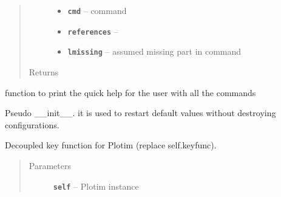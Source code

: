 \documentclass[letterpaper,10pt,english]{sphinxmanual}
\begin{document}
\begin{fulllineitems}
\begin{fulllineitems}
\begin{quote}
\begin{description}
\begin{itemize}
\item {} 
\textbf{\texttt{cmd}} -- command

\item {} 
\textbf{\texttt{references}} -- 

\item {} 
\textbf{\texttt{lmissing}} -- assumed missing part in command

\end{itemize}

\item[{Returns}] \leavevmode


\end{description}\end{quote}

\end{fulllineitems}


\begin{fulllineitems}
\label{RRtoolbox.lib:RRtoolbox.lib.plotter.Plotim.help}
function to print the quick help for the user with all the commands

\end{fulllineitems}


\begin{fulllineitems}
\label{RRtoolbox.lib:RRtoolbox.lib.plotter.Plotim.init}
Pseudo \_\_init\_\_. it is used to restart default
values without destroying configurations.

\end{fulllineitems}


\begin{fulllineitems}
\label{RRtoolbox.lib:RRtoolbox.lib.plotter.Plotim.keyfunc}
Decoupled key function for Plotim (replace self.keyfunc).
\begin{quote}\begin{description}
\item[{Parameters}] \leavevmode
\textbf{\texttt{self}} -- Plotim instance

\end{description}\end{quote}


\end{fulllineitems}
\end{fulllineitems}
\end{document}
